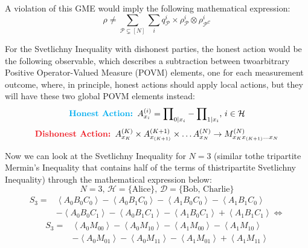 \documentclass[12pt]{article}
\begin{document}
    \noindent A violation of this GME would imply the following mathematical expression:
    $$ \rho \neq \sum_{\mathcal{P} \subsetneq [N]} \sum_{i} {q}_{\mathcal{P}}^{i} \times {\rho}_{\mathcal{P}}^{i} \otimes {\rho}_{{\mathcal{P}}^{\mathcal{C}}}^{i} $$
    
    \noindent For the Svetlichny Inequality with dishonest parties, the honest action would be the following observable, which describes a subtraction between two\break arbitrary Positive Operator-Valued Measure (POVM) elements, one for each measurement outcome, where, in principle, honest actions should apply local actions, but they will have these two global POVM elements instead:
    $$ \mathrm{\text{\color{Cyan}\textbf{Honest Action: }\color{Black} }} {A}_{{x}_{i}}^{(i)} = {\prod}_{0|{x}_{i}} - {\prod}_{1|{x}_{i}} \mathrm{\text{, }} i \in \mathcal{H} $$
    $$ \mathrm{\text{\color{Red}\textbf{Dishonest Action: }\color{Black} }} {A}_{{x}_{K}}^{(K)} \times {A}_{{x}_{(K + 1)}}^{(K + 1)} \times \dots {A}_{{x}_{N}}^{(N)} \rightarrow {M}_{{x}_{K} {x}_{(K + 1)} \dots {x}_{N}}^{(N)} $$

    \noindent Now we can look at the Svetlichny Inequality for $N = 3$ (similar to\break the tripartite Mermin's Inequality \cite{mermin:extreme-quantum-entanglement-superposition-macroscopically-distinct-states:1990:02-2024} that contains half of the terms of this\break tripartite Svetlichny Inequality) through the mathematical expression below:
    $$ N = 3 \mathrm{\text{, }} \mathcal{H} = \{ \mathrm{\text{Alice}} \} \mathrm{\text{, }} \mathcal{D} = \{ \mathrm{\text{Bob, Charlie}} \} $$
    \begin{equation*}
        \begin{aligned}
            {S}_{3} = & \left\langle {A}_{0} {B}_{0} {C}_{0} \right\rangle - \left\langle {A}_{0} {B}_{1} {C}_{0} \right\rangle - \left\langle {A}_{1} {B}_{0} {C}_{0} \right\rangle - \left\langle {A}_{1} {B}_{1} {C}_{0} \right\rangle \\
            & - \left\langle {A}_{0} {B}_{0} {C}_{1} \right\rangle - \left\langle {A}_{0} {B}_{1} {C}_{1} \right\rangle - \left\langle {A}_{1} {B}_{0} {C}_{1} \right\rangle + \left\langle {A}_{1} {B}_{1} {C}_{1} \right\rangle \Leftrightarrow
        \end{aligned}
    \end{equation*}
    \begin{equation*}
        \begin{aligned}
            {S}_{3} = & \left\langle {A}_{0} {M}_{00} \right\rangle - \left\langle {A}_{0} {M}_{10} \right\rangle - \left\langle {A}_{1} {M}_{00} \right\rangle - \left\langle {A}_{1} {M}_{10} \right\rangle \\
            & - \left\langle {A}_{0} {M}_{01} \right\rangle - \left\langle {A}_{0} {M}_{11} \right\rangle - \left\langle {A}_{1} {M}_{01} \right\rangle + \left\langle {A}_{1} {M}_{11} \right\rangle
        \end{aligned}
    \end{equation*}
    
\end{document}

